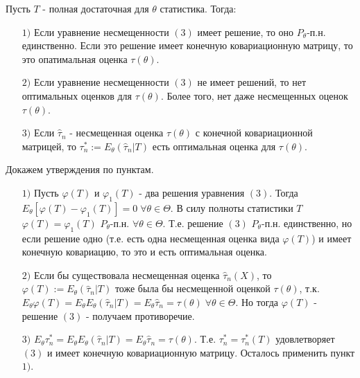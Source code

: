 \begin{lemma}\label{cha:7/lemma:1}
	Пусть $T$ - полная достаточная для $\theta$ статистика. Тогда:
	\begin{itemize}
		\item[$1)$]
			Если уравнение несмещенности $(3)$ имеет решение, то оно $P_{\theta}$-п.н. единственно. Если это решение имеет конечную ковариационную матрицу, то это опатимальная оценка $\tau(\theta)$.
		\item[$2)$]
			Если уравнение несмещенности $(3)$ не имеет решений, то нет оптимальных оценков для $\tau(\theta)$. Более того, нет даже несмещенных оценок $\tau(\theta)$.
		\item[$3)$]
			Если $\hat{\tau}_n$ - несмещенная оценка $\tau(\theta)$ с конечной ковариационной матрицей, то $\displaystyle \tau_n^* := E_{\theta} (\hat{\tau}_n | T)$ есть оптимальная оценка для $\tau (\theta)$.
	\end{itemize}
\end{lemma}
\begin{Proof}
	Докажем утверждения по пунктам.
	\begin{itemize}
		\item[$1)$]
			Пусть $\varphi(T)$ и $\varphi_1(T)$ - два решения уравнения $(3)$. Тогда $\displaystyle E_{\theta} \left[ \varphi(T) - \varphi_1(T) \right] = 0 \; \forall \theta \in \Theta$. В силу полноты статистики $T$ $\varphi(T) = \varphi_1(T)$ $P_{\theta}$-п.н. $\forall \theta \in \Theta$. Т.е. решение $(3)$ $P_{\theta}$-п.н. единственно, но если решение одно (т.е. есть одна несмещенная оценка вида $\varphi(T)$) и имеет конечную ковариацию, то это и есть оптимальная оценка.
		\item[$2)$]
			Если бы существовала несмещенная оценка $\hat{\tau}_n (X)$, то $\varphi(T) := E_{\theta}(\hat{\tau}_n | T)$ тоже была бы несмещенной оценкой $\tau (\theta)$, т.к. $\displaystyle E_{\theta} \varphi(T) = E_{\theta} E_{\theta} (\hat{\tau}_n |T) = E_{\theta}\hat{\tau}_n = \tau (\theta) \; \forall \theta \in \Theta$. Но тогда $\varphi(T)$ - решение $(3)$ - получаем противоречие.
		\item[$3)$]
			$\displaystyle E_{\theta} \tau_n^* = E_{\theta} E_{\theta} (\hat{\tau}_n |T) = E_{\theta}\hat{\tau}_n = \tau (\theta)$. Т.е. $\tau_n^* = \tau_n^* (T)$ удовлетворяет $(3)$ и имеет конечную ковариационную матрицу. Осталось применить пункт $1)$.
	\end{itemize}
\end{Proof}

